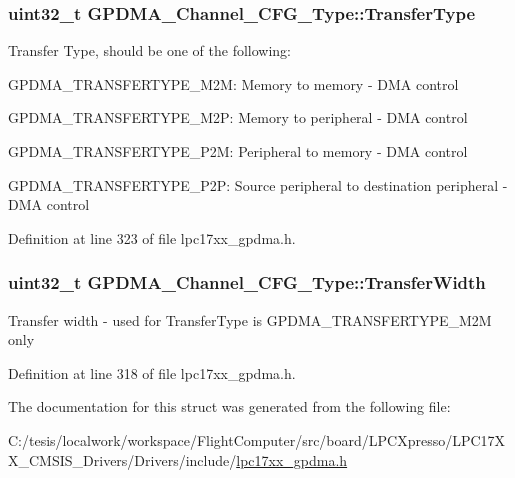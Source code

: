 \hypertarget{struct_g_p_d_m_a___channel___c_f_g___type_ab3090bb6d00e2733ddce843b54714f71}{
\subsubsection[{\-Transfer\-Type}]{\setlength{\rightskip}{0pt plus 5cm}uint32\-\_\-t {\bf \-G\-P\-D\-M\-A\-\_\-\-Channel\-\_\-\-C\-F\-G\-\_\-\-Type\-::\-Transfer\-Type}}}\label{struct_g_p_d_m_a___channel___c_f_g___type_ab3090bb6d00e2733ddce843b54714f71}
\-Transfer \-Type, should be one of the following\-:
\begin{DoxyItemize}
\item \-G\-P\-D\-M\-A\-\_\-\-T\-R\-A\-N\-S\-F\-E\-R\-T\-Y\-P\-E\-\_\-\-M2\-M\-: \-Memory to memory -\/ \-D\-M\-A control
\item \-G\-P\-D\-M\-A\-\_\-\-T\-R\-A\-N\-S\-F\-E\-R\-T\-Y\-P\-E\-\_\-\-M2\-P\-: \-Memory to peripheral -\/ \-D\-M\-A control
\item \-G\-P\-D\-M\-A\-\_\-\-T\-R\-A\-N\-S\-F\-E\-R\-T\-Y\-P\-E\-\_\-\-P2\-M\-: \-Peripheral to memory -\/ \-D\-M\-A control
\item \-G\-P\-D\-M\-A\-\_\-\-T\-R\-A\-N\-S\-F\-E\-R\-T\-Y\-P\-E\-\_\-\-P2\-P\-: \-Source peripheral to destination peripheral -\/ \-D\-M\-A control 
\end{DoxyItemize}

\-Definition at line 323 of file lpc17xx\-\_\-gpdma.\-h.

\hypertarget{struct_g_p_d_m_a___channel___c_f_g___type_aefd7f203fe445e20b266dba772df844d}{
\subsubsection[{\-Transfer\-Width}]{\setlength{\rightskip}{0pt plus 5cm}uint32\-\_\-t {\bf \-G\-P\-D\-M\-A\-\_\-\-Channel\-\_\-\-C\-F\-G\-\_\-\-Type\-::\-Transfer\-Width}}}\label{struct_g_p_d_m_a___channel___c_f_g___type_aefd7f203fe445e20b266dba772df844d}
\-Transfer width -\/ used for \-Transfer\-Type is \-G\-P\-D\-M\-A\-\_\-\-T\-R\-A\-N\-S\-F\-E\-R\-T\-Y\-P\-E\-\_\-\-M2\-M only 

\-Definition at line 318 of file lpc17xx\-\_\-gpdma.\-h.



\-The documentation for this struct was generated from the following file\-:\begin{DoxyCompactItemize}
\item 
\-C\-:/tesis/localwork/workspace/\-Flight\-Computer/src/board/\-L\-P\-C\-Xpresso/\-L\-P\-C17\-X\-X\-\_\-\-C\-M\-S\-I\-S\-\_\-\-Drivers/\-Drivers/include/\hyperlink{lpc17xx__gpdma_8h}{lpc17xx\-\_\-gpdma.\-h}\end{DoxyCompactItemize}
